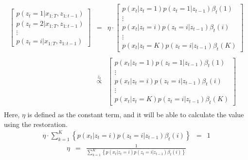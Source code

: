 \documentclass[a4paper]{article}
\newcommand{\proptoas}[1]{\overset{#1}{\propto}}
\begin{document}
	\begin{eqnarray}
		\left[
			\begin{array}{c}
				p(z_t = 1 | x_{1:T}, z_{1:t-1}) \\
				p(z_t = 2 | x_{1:T}, z_{1:t-1}) \\
				\vdots \\
				p(z_t = i | x_{1:T}, z_{1:t-1})
			\end{array}
		\right]
		&=&
		\eta \cdot
		\left[
			\begin{array}{c}
				p(x_t | z_t = 1) p(z_t = 1 | z_{t-1}) \beta_t(1) \\
				\vdots \\
				p(x_t | z_t = i) p(z_t = i | z_{t-1}) \beta_t(i) \\
				\vdots \\
				p(x_t | z_t = K) p(z_t = i | z_{t-1}) \beta_t(K)
			\end{array}
		\right] \nonumber \\
		\nonumber \\
		&\proptoas{z_t}&
		\left[
			\begin{array}{c}
				p(x_t | z_t = 1) p(z_t = 1 | z_{t-1}) \beta_t(1) \\
				\vdots \\
				p(x_t | z_t = i) p(z_t = i | z_{t-1}) \beta_t(i) \\
				\vdots \\
				p(x_t | z_t = K) p(z_t = i | z_{t-1}) \beta_t(K)
			\end{array}
		\right] \nonumber \\
	\end{eqnarray}
	Here, $\eta$ is defined as the constant term, and it will be able to calculate the value using the restoration.
	\begin{eqnarray}
		\eta \cdot \sum_{k=1}^{K}{\left\{p(x_t | z_t = i) p(z_t = i | z_{t-1}) \beta_t(i)\right\}} &=& 1
	\end{eqnarray}
	\begin{eqnarray}
	\eta &=& \frac{1}{\sum_{k=1}^{K}{\left\{p(x_t | z_t = i) p(z_t = i | z_{t-1}) \beta_t(i)\right\}}}
	\end{eqnarray}
\end{document}
